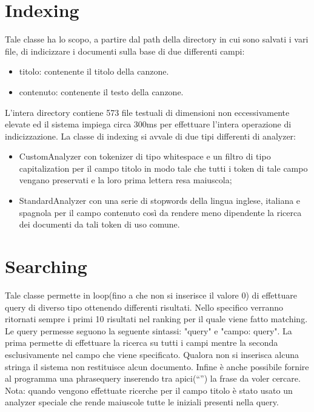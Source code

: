 \documentclass[12pt, letterpaper]{article}
\begin{document}
\section{Indexing}
Tale classe ha lo scopo, a partire dal path della directory in cui sono salvati i vari file, di indicizzare i documenti sulla base di due differenti campi: 
\begin{itemize}
    \item titolo: contenente il titolo della canzone.
    \item contenuto: contenente il testo della canzone.
\end{itemize}
L'intera directory contiene 573 file testuali di dimensioni non eccessivamente elevate ed il sistema impiega circa 300ms per effettuare l'intera operazione di indicizzazione. La classe di indexing si avvale di due tipi differenti di analyzer:
\begin{itemize}
    \item CustomAnalyzer con tokenizer di tipo whitespace e un filtro di tipo capitalization per il campo titolo in modo tale che tutti i token di tale campo vengano preservati e la loro prima lettera resa maiuscola;
    \item StandardAnalyzer con una serie di stopwords della lingua inglese, italiana e spagnola per il campo contenuto così da rendere meno dipendente la ricerca dei documenti da tali token di uso comune.
\end{itemize}
\section{Searching}
Tale classe permette in loop(fino a che non si inserisce il valore 0) di effettuare query di diverso tipo ottenendo differenti risultati. Nello specifico verranno ritornati sempre i primi 10 risultati nel ranking per il quale viene fatto matching. Le query permesse seguono la seguente sintassi: "query" e "campo: query". La prima permette di effettuare la ricerca su tutti i campi mentre la seconda esclusivamente nel campo che viene specificato. Qualora non si inserisca alcuna stringa il sistema non restituisce alcun documento. Infine è anche possibile fornire al programma una phrasequery inserendo tra apici(“”) la frase da voler cercare. Nota: quando vengono effettuate ricerche per il campo titolo è stato usato un analyzer speciale che rende maiuscole tutte le iniziali presenti nella query.
\end{document}
